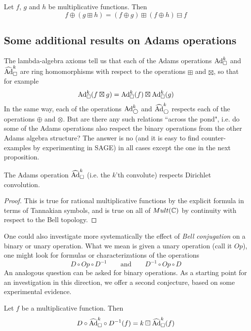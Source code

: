 \begin{conjecture}
Let $f$, $g$ and $h$ be multiplicative functions. Then
$$ f \oplus (g \boxplus h) = (f \oplus g) \boxplus (f \oplus h) \boxminus f     $$
\end{conjecture}


\subsection{Some additional results on Adams operations}

The lambda-algebra axioms tell us that each of the Adams operations $\text{Ad}^{k}_{\square}$ and $\widehat{\text{Ad}}^{k}_{\square}$ are ring homomorphisms with respect to the operations $\boxplus$ and $\boxtimes$, so that for example
$$  \text{Ad}^{k}_{\square}(f \boxtimes g) = \text{Ad}^{k}_{\square}(f) \boxtimes \text{Ad}^{k}_{\square}(g) $$
In the same way, each of the operations $\text{Ad}^{k}_{\bigcirc}$ and $\widehat{\text{Ad}}^{k}_{\bigcirc}$ respects each of the operations $\oplus$ and $\otimes$. But are there any such relations ``across the pond", i.e. do some of the Adams operations also respect the binary operations from the other Adams algebra structure? The answer is no (and it is easy to find counter-examples by experimenting in SAGE) in all cases except the one in the next proposition.

\begin{proposition}
The Adams operation $\widehat{\text{Ad}}^{k}_{\square}$ (i.e. the $k$'th convolute) respects Dirichlet convolution.
\end{proposition}
\begin{proof}
This is true for rational multiplicative functions by the explicit formula in terms of Tannakian symbols, and is true on all of $Mult(\mathbb{C})$ by continuity with respect to the Bell topology.
\end{proof}


One could also investigate more systematically the effect of \emph{Bell conjugation} on a binary or unary operation. What we mean is given a unary operation (call it $Op$), one might look for formulas or characterizations of the operations
$$ D \circ Op \circ D^{-1}  \quad \quad \textrm{and}  \quad \quad D^{-1} \circ Op \circ D $$
An analogous question can be asked for binary operations. As a starting point for an investigation in this direction, we offer a second conjecture, based on some experimental evidence.
\begin{conjecture}
Let $f$ be a multiplicative function. Then 
$$ D \circ \widehat{\text{Ad}}^{k}_{\square} \circ D^{-1} ( f ) = k \boxdot \widehat{\text{Ad}}^{k}_{\square} (f)  $$
\end{conjecture}

